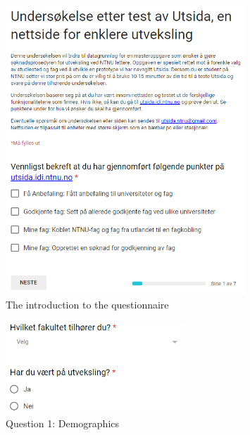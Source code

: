 \begin{figure}[h]
    \centering
    \includegraphics[width=0.8\textwidth]{fig/form2/front.PNG}
    \caption{The introduction to the questionnaire}
    \label{fig:my_label}
\end{figure}
\begin{figure}[h]
    \centering
    \includegraphics[width=0.6\textwidth]{fig/form2/s2.PNG}
    \caption{Question 1: Demographics}
    \label{fig:my_label}
\end{figure}

